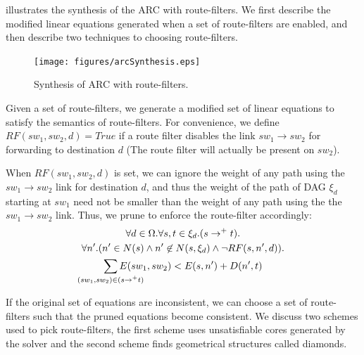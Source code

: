  illustrates the synthesis of 
the ARC with route-filters. We first describe the 
modified linear equations generated when a set of
route-filters are enabled, and then describe two
techniques to choosing route-filters. 
\begin{figure}
	\centering
	\texttt{[image: figures/arcSynthesis.eps]}
	\caption{Synthesis of ARC with route-filters.} \label{fig:arcSynthesis}
\end{figure}

Given a set of route-filters, we generate a modified 
set of linear equations to satisfy the 
semantics of route-filters.
For convenience, we define $RF(sw_1, sw_2, d) = True$ 
if a route filter disables the link $sw_1 \rightarrow sw_2$
for forwarding to destination $d$ (The route filter will
actually be present on $sw_2$). 

When $RF(sw_1, sw_2, d)$ is set, we can ignore the 
weight of any path using the $sw_1 \rightarrow sw_2$
link for destination $d$, and thus 
the weight of the path of DAG $\xi_d$
starting at $sw_1$ need not be smaller than the weight
of any path
using the the $sw_1 \rightarrow sw_2$ link. Thus,
we prune  to enforce the route-filter accordingly:
\begin{multline} \label{eq:uniq-filt}
		\forall d \in \Omega. \forall s, t \in \xi_d. (s \rightarrow^+ t).\\ 
		\forall n'. (n' \in N(s) \wedge n' \not\in N(s, \xi_d) \wedge \neg RF(s,n',d)). \\
		\sum_{\mathclap{\substack{(sw_1, sw_2) \in (s \rightarrow^+ t)}}} 
		E(sw_1, sw_2) < E(s, n') + D(n', t)   
\end{multline}

If the original set of equations are inconsistent, we 
can choose a set of route-filters such that the pruned
equations become consistent. 
We discuss two schemes used to pick route-filters,
the first scheme uses unsatisfiable cores generated
by the solver and the second scheme 
finds geometrical structures called diamonds.



